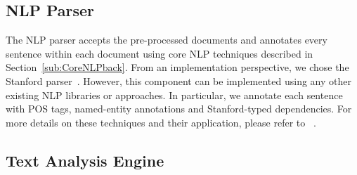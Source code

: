 	
\subsection{NLP Parser}


The NLP parser accepts the pre-processed documents and annotates every sentence within each document using core NLP techniques described in Section~\ref{sub:CoreNLPback}.
From an implementation perspective, we chose the Stanford parser~\cite{Manning:01}.
However, this component can be implemented using any other existing NLP libraries or approaches.
In particular, we annotate each sentence with POS tags, named-entity annotations and Stanford-typed dependencies.
For more details on these techniques and their application, please refer to ~\cite{Marneffe06LREC, Marneffe08COLING, pandita12:inferring, pandita13:WHYPER, thummalapentaICSE12}.

%

\subsection{Text Analysis Engine}
\label{sub:TAE}
%

